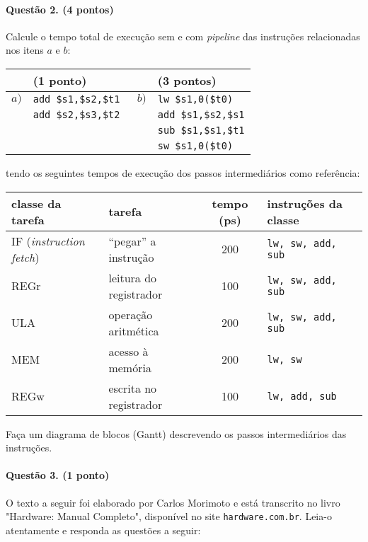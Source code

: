 \paragraph{Questão 2. (4 pontos)} Calcule o tempo total de execução sem e com {\em
  pipeline} das instruções relacionadas nos itens $a$ e $b$:

\begin{center}
\begin{tabular}{|ll|ll|}\hline
     &  (1 ponto)             &       & (3 pontos) \\\hline\hline
$a)$ & \tt add \$s1,\$s2,\$t1 &  $b)$ & \tt lw  \$s1,0(\$t0)\\
     & \tt add \$s2,\$s3,\$t2 &     & \tt add \$s1,\$s2,\$s1\\
     &                        &     & \tt sub \$s1,\$s1,\$t1\\
     &                        &     & \tt sw  \$s1,0(\$t0)\\\hline
 \end{tabular}
\end{center}

\noindent tendo os seguintes tempos de execução dos passos intermediários
como referência:\\

\begin{tabular}{l|l|c|l}\hline
{\bf\small classe da tarefa}  & \hfil {\bf tarefa} \hfill& {\bf tempo
  (ps)} & \hfil {\bf\small instruções da classe} \hfill \\\hline\hline
 IF ({\em instruction fetch}) & ``pegar'' a instrução & 200 & {\tt lw, sw,
 add, sub}\\\hline
 REGr &  leitura do registrador & 100 & {\tt lw, sw, add, sub}\\\hline
 ULA & operação aritmética & 200 & {\tt lw, sw, add, sub}\\\hline
 MEM & acesso à memória & 200 & {\tt lw, sw}\\\hline
 REGw & escrita no registrador & 100 & {\tt lw, add, sub}\\\hline
\end{tabular}

\bigskip
\noindent Faça um diagrama de blocos (Gantt) descrevendo os passos intermediários das
instruções.


\paragraph{Questão 3. (1 ponto)} O texto a seguir foi elaborado por
Carlos Morimoto e está transcrito no livro "Hardware: Manual Completo",
 disponível no site {\tt hardware.com.br}. Leia-o atentamente e responda as 
 questões a seguir:

